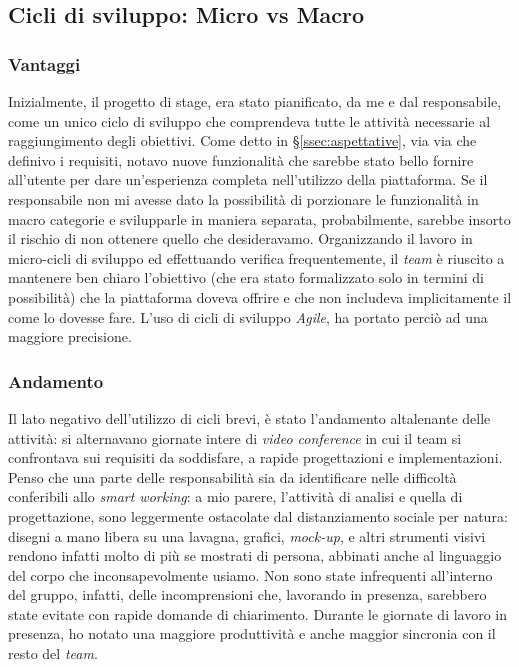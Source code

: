 \subsection{Cicli di sviluppo: Micro vs Macro}
\subsubsection{Vantaggi}
Inizialmente, il progetto di stage, era stato pianificato, da me e dal responsabile, come un unico ciclo di sviluppo che comprendeva tutte le attività necessarie al raggiungimento degli obiettivi. Come detto in \S\ref{ssec:aspettative}, via via che definivo i requisiti, notavo nuove funzionalità che sarebbe stato bello fornire all'utente per dare un'esperienza completa nell'utilizzo della piattaforma. Se il responsabile non mi avesse dato la possibilità di porzionare le funzionalità in macro categorie e svilupparle in maniera separata, probabilmente, sarebbe insorto il rischio di non ottenere quello che desideravamo. Organizzando il lavoro in micro-cicli di sviluppo ed effettuando verifica frequentemente, il \textit{team} è riuscito a mantenere ben chiaro l'obiettivo (che era stato formalizzato solo in termini di possibilità) che la piattaforma doveva offrire e che non includeva implicitamente il come lo dovesse fare.
L'uso di cicli di sviluppo \textit{Agile}, ha portato perciò ad una maggiore precisione.
\subsubsection{Andamento}
Il lato negativo dell'utilizzo di cicli brevi, è stato l'andamento altalenante delle attività: si alternavano giornate intere di \textit{video conference} in cui il team si confrontava sui requisiti da soddisfare, a rapide progettazioni e implementazioni. Penso che una parte delle responsabilità sia da identificare nelle difficoltà conferibili allo \textit{smart working}: a mio parere, l'attività di analisi e quella di progettazione, sono leggermente ostacolate dal distanziamento sociale per natura: disegni a mano libera su una lavagna, grafici, \textit{mock-up}, e altri strumenti visivi rendono infatti molto di più se mostrati di persona, abbinati anche al linguaggio del corpo che inconsapevolmente usiamo. Non sono state infrequenti all'interno del gruppo, infatti, delle incomprensioni che, lavorando in presenza, sarebbero state evitate con rapide domande di chiarimento. Durante le giornate di lavoro in presenza, ho notato una maggiore produttività e anche maggior sincronia con il resto del \textit{team}.
\newpage
